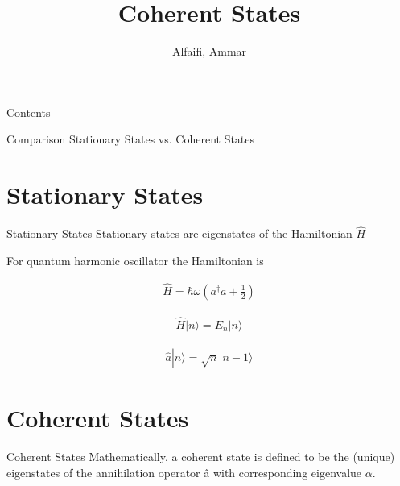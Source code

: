 \documentclass{loyola-beamer}
\title{Coherent States}
\author{Alfaifi, Ammar}
\institute{KFUPM}
\begin{document}
\begin{titleframe}{}
	\maketitle
\end{titleframe}

\begin{frame}{Contents}
	\tableofcontents
\end{frame}



\begin{titleframe}{Comparison}
	Stationary States vs. Coherent States
\end{titleframe}

\section{Stationary States}

\begin{frame}{Stationary States}
	Stationary states are eigenstates of the Hamiltonian $\hat{H}$

	\vspace{\baselineskip}
	For quantum harmonic oscillator the Hamiltonian is

	\begin{align*}
		\hat{H} = \hbar \omega \left(  a^\dagger a + \frac{1}{2} \right)
		\label{eq:Hamiltonian}
	\end{align*}

	\begin{align*}
		\hat{H} |n \rangle = E_n |n \rangle
	\end{align*}

	\begin{align*}
		\hat{a} |n \rangle = \sqrt{n} |{n-1} \rangle
	\end{align*}

\end{frame}


\section{Coherent States}

\begin{frame}{Coherent States}
	Mathematically, a coherent state is defined to be the (unique)
	eigenstates of the annihilation operator â with corresponding eigenvalue $\alpha$.

	\vspace{\baselineskip}
\end{frame}
\end{document}
